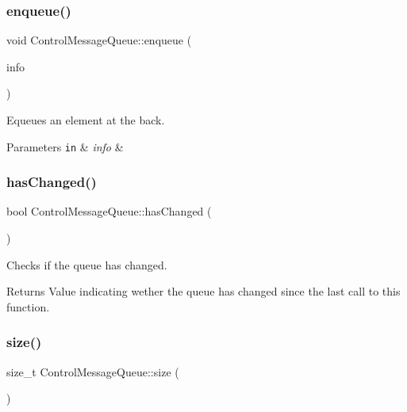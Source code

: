 \subsubsection{\texorpdfstring{enqueue()}{enqueue()}}
{\footnotesize\ttfamily void Control\+Message\+Queue\+::enqueue (\begin{DoxyParamCaption}\item[{\mbox{\hyperlink{structControlMessageQueue_1_1ControlMessageInfo}{Control\+Message\+Queue\+::\+Control\+Message\+Info}}}]{info }\end{DoxyParamCaption})}



Equeues an element at the back. 


\begin{DoxyParams}[1]{Parameters}
\mbox{\tt in}  & {\em info} & \\
\hline
\end{DoxyParams}
\mbox{\label{classControlMessageQueue_ad0d97de85cb34b781fde757b665fb22e}} 
\subsubsection{\texorpdfstring{has\+Changed()}{hasChanged()}}
{\footnotesize\ttfamily bool Control\+Message\+Queue\+::has\+Changed (\begin{DoxyParamCaption}{ }\end{DoxyParamCaption})}



Checks if the queue has changed. 

\begin{DoxyReturn}{Returns}
Value indicating wether the queue has changed since the last call to this function. 
\end{DoxyReturn}
\mbox{\label{classControlMessageQueue_a3b2d120facfc58fcdc315a806d76851a}} 
\subsubsection{\texorpdfstring{size()}{size()}}
{\footnotesize\ttfamily size\+\_\+t Control\+Message\+Queue\+::size (\begin{DoxyParamCaption}{ }\end{DoxyParamCaption})}



